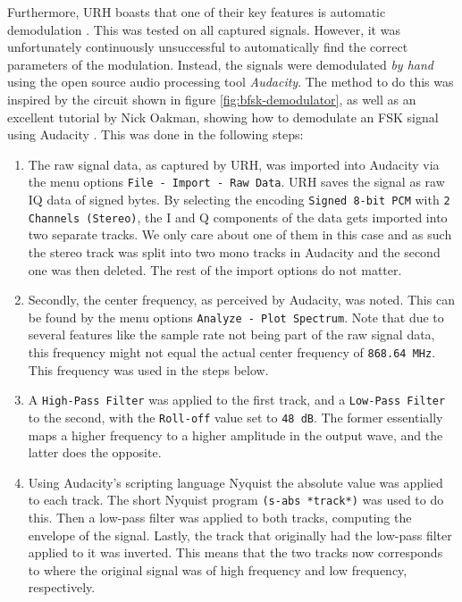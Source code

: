 Furthermore, \gls{URH} boasts that one of their key features is automatic demodulation \cite{urh}. This was tested on all captured signals. However, it was unfortunately continuously unsuccessful to automatically find the correct parameters of the modulation. Instead, the signals were demodulated \textit{by hand} using the open source audio processing tool \textit{Audacity}. The method to do this was inspired by the circuit shown in figure \ref{fig:bfsk-demodulator}, as well as an excellent tutorial by Nick Oakman, showing how to demodulate an FSK signal using Audacity \cite{oakman-fsk}. This was done in the following steps:
\begin{enumerate}
    \item The raw signal data, as captured by URH, was imported into Audacity via the menu options \texttt{File - Import - Raw Data}. URH saves the signal as raw IQ data of signed bytes. By selecting the encoding \texttt{Signed 8-bit PCM} with \texttt{2 Channels (Stereo)}, the I and Q components of the data gets imported into two separate tracks. We only care about one of them in this case and as such the stereo track was split into two mono tracks in Audacity and the second one was then deleted. The rest of the import options do not matter.

    \item Secondly, the center frequency, as perceived by Audacity, was noted. This can be found by the menu options \texttt{Analyze - Plot Spectrum}. Note that due to several features like the sample rate not being part of the raw signal data, this frequency might not equal the actual center frequency of \texttt{868.64 MHz}. This frequency was used in the steps below.

    \item A \texttt{High-Pass Filter} was applied to the first track, and a \texttt{Low-Pass Filter} to the second, with the \texttt{Roll-off} value set to \texttt{48 dB}. The former essentially maps a higher frequency to a higher amplitude in the output wave, and the latter does the opposite.

    \item Using Audacity's scripting language Nyquist the absolute value was applied to each track. The short Nyquist program \texttt{(s-abs *track*)} was used to do this. Then a low-pass filter was applied to both tracks, computing the envelope of the signal. Lastly, the track that originally had the low-pass filter applied to it was inverted. This means that the two tracks now corresponds to where the original signal was of high frequency and low frequency, respectively.


\end{enumerate}
